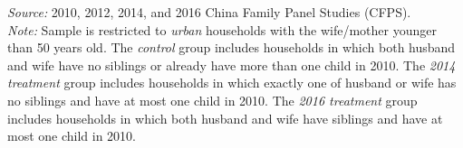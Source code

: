 \documentclass[12pt]{extarticle}
\begin{document}
\begin{landscape}
\begin{table}
\begin{threeparttable}
\begin{tablenotes}
\footnotesize \textit{Source:} 2010, 2012, 2014, and 2016 China Family Panel Studies (CFPS). \\
\textit{Note:} Sample is restricted to \textit{urban} households with the wife/mother younger than 50 years old. The \textit{control} group includes households in which both husband and wife have no siblings or already have more than one child in 2010. The \textit{2014 treatment} group includes households in which exactly one of husband or wife has no siblings and have at most one child in 2010. The \textit{2016 treatment} group includes households in which both husband and wife have siblings and have at most one child in 2010.
\end{tablenotes}
\end{threeparttable}
\end{table}
\end{landscape}
\end{document}
